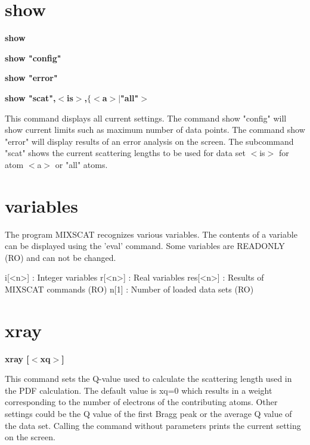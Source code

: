 \section{show}
{\bf show \par }
{\bf show "config" \par }
{\bf show "error" \par }
{\bf show "scat",$ <$is$> $,$ \{$$ <$a$> $$| $"all"$> $ \par }
\par
\vspace{3pt}
This command displays all current settings. The command show "config" 
will show current limits such as maximum number of data points. The 
command show "error" will display results of an error analysis on 
the screen. The subcommand "scat" shows the current scattering lengths 
to be used for data set $ <$is$> $ for atom $ <$a$> $ or "all" atoms. 
\section{variables}
\par
The program MIXSCAT recognizes various variables. The contents of a 
variable can be displayed using the 'eval' command. Some variables 
are READONLY (RO) and can not be changed. 
\par
\begin{MacVerbatim}
i[<n>]      : Integer variables
r[<n>]      : Real variables
res[<n>]    : Results of MIXSCAT commands (RO)
n[1]        : Number of loaded data sets (RO)
\end{MacVerbatim}
\section{xray}
{\bf xray [$ <$xq$> $] \par }
\par
\vspace{3pt}
This command sets the Q-value used to calculate the scattering 
length used in the PDF calculation. The default value is xq=0 
which results in a weight corresponding to the number of electrons 
of the contributing atoms. Other settings could be the Q value 
of the first Bragg peak or the average Q value of the data set. 
Calling the command without parameters prints the current setting 
on the screen. 
